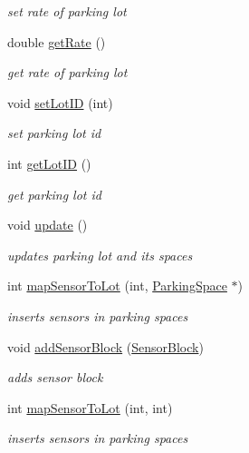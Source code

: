 \begin{DoxyCompactItemize}
\begin{DoxyCompactList}\small\item\em set rate of parking lot \end{DoxyCompactList}\item 
double \mbox{\hyperlink{class_parking_lot_abd4aba799c6f13e467ed0b5e17ef70eb}{get\+Rate}} ()
\begin{DoxyCompactList}\small\item\em get rate of parking lot \end{DoxyCompactList}\item 
void \mbox{\hyperlink{class_parking_lot_a10ff48e3483395f5fa7fd15a80913515}{set\+Lot\+ID}} (int)
\begin{DoxyCompactList}\small\item\em set parking lot id \end{DoxyCompactList}\item 
int \mbox{\hyperlink{class_parking_lot_ac6269a82ab516553047cefacc229e5e0}{get\+Lot\+ID}} ()
\begin{DoxyCompactList}\small\item\em get parking lot id \end{DoxyCompactList}\item 
void \mbox{\hyperlink{class_parking_lot_a92c159f21260da7fd2bba061f1781382}{update}} ()
\begin{DoxyCompactList}\small\item\em updates parking lot and its spaces \end{DoxyCompactList}\item 
int \mbox{\hyperlink{class_parking_lot_a7d749c2ac49c9e84d33b21d29a288ebf}{map\+Sensor\+To\+Lot}} (int, \mbox{\hyperlink{class_parking_space}{Parking\+Space}} $\ast$)
\begin{DoxyCompactList}\small\item\em inserts sensors in parking spaces \end{DoxyCompactList}\item 
void \mbox{\hyperlink{class_parking_lot_a8a52aa523041af660f59ac566f7af780}{add\+Sensor\+Block}} (\mbox{\hyperlink{class_sensor_block}{Sensor\+Block}})
\begin{DoxyCompactList}\small\item\em adds sensor block \end{DoxyCompactList}\item 
int \mbox{\hyperlink{class_parking_lot_a3ad5598c96642089744b786bd131f308}{map\+Sensor\+To\+Lot}} (int, int)
\begin{DoxyCompactList}\small\item\em inserts sensors in parking spaces \end{DoxyCompactList}\item 

\end{DoxyCompactItemize}
